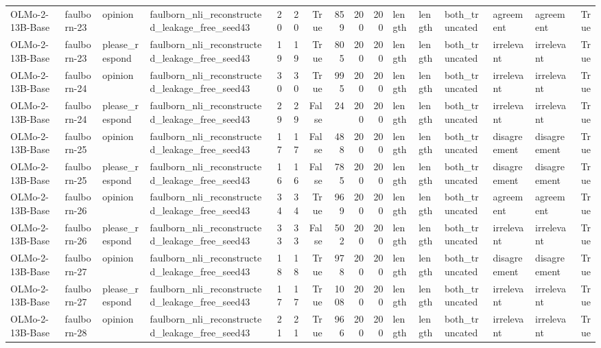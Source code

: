 \begin{tabular}{llllrrrrrrlllllr}
OLMo-2-13B-Base & faulborn-23 & opinion & faulborn_nli_reconstructed_leakage_free_seed43 & 20 & 20 & True & 859 & 200 & 200 & length & length & both_truncated & agreement & agreement & True \\
OLMo-2-13B-Base & faulborn-23 & please_respond & faulborn_nli_reconstructed_leakage_free_seed43 & 19 & 19 & True & 805 & 200 & 200 & length & length & both_truncated & irrelevant & irrelevant & True \\
OLMo-2-13B-Base & faulborn-24 & opinion & faulborn_nli_reconstructed_leakage_free_seed43 & 30 & 30 & True & 995 & 200 & 200 & length & length & both_truncated & irrelevant & irrelevant & True \\
OLMo-2-13B-Base & faulborn-24 & please_respond & faulborn_nli_reconstructed_leakage_free_seed43 & 29 & 29 & False & 24 & 200 & 200 & length & length & both_truncated & irrelevant & irrelevant & True \\
OLMo-2-13B-Base & faulborn-25 & opinion & faulborn_nli_reconstructed_leakage_free_seed43 & 17 & 17 & False & 488 & 200 & 200 & length & length & both_truncated & disagreement & disagreement & True \\
OLMo-2-13B-Base & faulborn-25 & please_respond & faulborn_nli_reconstructed_leakage_free_seed43 & 16 & 16 & False & 785 & 200 & 200 & length & length & both_truncated & disagreement & disagreement & True \\
OLMo-2-13B-Base & faulborn-26 & opinion & faulborn_nli_reconstructed_leakage_free_seed43 & 34 & 34 & True & 969 & 200 & 200 & length & length & both_truncated & agreement & agreement & True \\
OLMo-2-13B-Base & faulborn-26 & please_respond & faulborn_nli_reconstructed_leakage_free_seed43 & 33 & 33 & False & 502 & 200 & 200 & length & length & both_truncated & irrelevant & irrelevant & True \\
OLMo-2-13B-Base & faulborn-27 & opinion & faulborn_nli_reconstructed_leakage_free_seed43 & 18 & 18 & True & 978 & 200 & 200 & length & length & both_truncated & disagreement & disagreement & True \\
OLMo-2-13B-Base & faulborn-27 & please_respond & faulborn_nli_reconstructed_leakage_free_seed43 & 17 & 17 & True & 1008 & 200 & 200 & length & length & both_truncated & irrelevant & irrelevant & True \\
OLMo-2-13B-Base & faulborn-28 & opinion & faulborn_nli_reconstructed_leakage_free_seed43 & 21 & 21 & True & 966 & 200 & 200 & length & length & both_truncated & irrelevant & irrelevant & True \\

\end{tabular}
